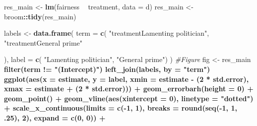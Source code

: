 \documentclass[]{book}
\newenvironment{Shaded}{\begin{snugshade}}{\end{snugshade}}
\newcommand{\KeywordTok}[1]{\textcolor[rgb]{0.13,0.29,0.53}{\textbf{#1}}}
\newcommand{\DataTypeTok}[1]{\textcolor[rgb]{0.13,0.29,0.53}{#1}}
\newcommand{\DecValTok}[1]{\textcolor[rgb]{0.00,0.00,0.81}{#1}}
\newcommand{\StringTok}[1]{\textcolor[rgb]{0.31,0.60,0.02}{#1}}
\newcommand{\CommentTok}[1]{\textcolor[rgb]{0.56,0.35,0.01}{\textit{#1}}}
\newcommand{\OperatorTok}[1]{\textcolor[rgb]{0.81,0.36,0.00}{\textbf{#1}}}
\newcommand{\NormalTok}[1]{#1}
\begin{document}
\begin{Shaded}
\begin{Highlighting}[]
\NormalTok{res_main <-}\StringTok{  }\KeywordTok{lm}\NormalTok{(fairness }\OperatorTok{~}\StringTok{ }\NormalTok{treatment, }\DataTypeTok{data =}\NormalTok{ d) }
\NormalTok{res_main <-}\StringTok{ }\NormalTok{broom}\OperatorTok{::}\KeywordTok{tidy}\NormalTok{(res_main)}

\NormalTok{labels <-}\StringTok{ }\KeywordTok{data.frame}\NormalTok{(}
  \DataTypeTok{term =} \KeywordTok{c}\NormalTok{(}
    \StringTok{"treatmentLamenting politician"}\NormalTok{,}
    \StringTok{"treatmentGeneral prime"}
    
\NormalTok{  ),}
  \DataTypeTok{label =} \KeywordTok{c}\NormalTok{( }\StringTok{"Lamenting politician"}\NormalTok{,}
             \StringTok{"General prime"}\NormalTok{)}
\NormalTok{)}
\CommentTok{#Figure}
\NormalTok{fig <-}\StringTok{   }\NormalTok{res_main }\OperatorTok{%>%}
\StringTok{  }\KeywordTok{filter}\NormalTok{(term }\OperatorTok{!=}\StringTok{ "(Intercept)"}\NormalTok{) }\OperatorTok{%>%}\StringTok{ }
\StringTok{  }\KeywordTok{left_join}\NormalTok{(labels, }\DataTypeTok{by =} \StringTok{"term"}\NormalTok{) }\OperatorTok{%>%}\StringTok{ }
\StringTok{  }
\StringTok{  }\KeywordTok{ggplot}\NormalTok{(}\KeywordTok{aes}\NormalTok{(}\DataTypeTok{x =}\NormalTok{ estimate, }\DataTypeTok{y =}\NormalTok{ label,}
             \DataTypeTok{xmin =}\NormalTok{ estimate }\OperatorTok{-}\StringTok{ }\NormalTok{(}\DecValTok{2} \OperatorTok{*}\StringTok{ }\NormalTok{std.error),}
             \DataTypeTok{xmax =}\NormalTok{ estimate }\OperatorTok{+}\StringTok{ }\NormalTok{(}\DecValTok{2} \OperatorTok{*}\StringTok{ }\NormalTok{std.error))) }\OperatorTok{+}
\StringTok{   }\KeywordTok{geom_errorbarh}\NormalTok{(}\DataTypeTok{height =} \DecValTok{0}\NormalTok{) }\OperatorTok{+}
\StringTok{  }\KeywordTok{geom_point}\NormalTok{() }\OperatorTok{+}
\StringTok{  }\KeywordTok{geom_vline}\NormalTok{(}\KeywordTok{aes}\NormalTok{(}\DataTypeTok{xintercept =} \DecValTok{0}\NormalTok{), }\DataTypeTok{linetype =} \StringTok{"dotted"}\NormalTok{) }\OperatorTok{+}
\StringTok{  }\KeywordTok{scale_x_continuous}\NormalTok{(}\DataTypeTok{limits =} \KeywordTok{c}\NormalTok{(}\OperatorTok{-}\DecValTok{1}\NormalTok{, }\DecValTok{1}\NormalTok{),}
                     \DataTypeTok{breaks =} \KeywordTok{round}\NormalTok{(}\KeywordTok{seq}\NormalTok{(}\OperatorTok{-}\DecValTok{1}\NormalTok{, }\DecValTok{1}\NormalTok{, .}\DecValTok{25}\NormalTok{), }\DecValTok{2}\NormalTok{),}
                     \DataTypeTok{expand =} \KeywordTok{c}\NormalTok{(}\DecValTok{0}\NormalTok{, }\DecValTok{0}\NormalTok{)) }\OperatorTok{+}
}}}
\end{Highlighting}
\end{Shaded}
\end{document}
